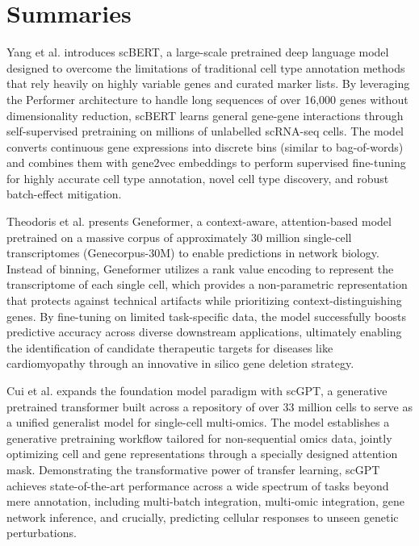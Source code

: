 \documentclass[12pt]{article}
\begin{document}
\section{Summaries}
Yang et al. \cite{yang2022scbert} introduces scBERT, a large-scale pretrained deep language model designed to overcome the limitations of traditional cell type annotation methods that rely heavily on highly variable genes and curated marker lists. By leveraging the Performer architecture to handle long sequences of over 16,000 genes without dimensionality reduction, scBERT learns general gene-gene interactions through self-supervised pretraining on millions of unlabelled scRNA-seq cells. The model converts continuous gene expressions into discrete bins (similar to bag-of-words) and combines them with gene2vec embeddings to perform supervised fine-tuning for highly accurate cell type annotation, novel cell type discovery, and robust batch-effect mitigation.

Theodoris et al. \cite{theodoris2023transfer} presents Geneformer, a context-aware, attention-based model pretrained on a massive corpus of approximately 30 million single-cell transcriptomes (Genecorpus-30M) to enable predictions in network biology. Instead of binning, Geneformer utilizes a rank value encoding to represent the transcriptome of each single cell, which provides a non-parametric representation that protects against technical artifacts while prioritizing context-distinguishing genes. By fine-tuning on limited task-specific data, the model successfully boosts predictive accuracy across diverse downstream applications, ultimately enabling the identification of candidate therapeutic targets for diseases like cardiomyopathy through an innovative in silico gene deletion strategy.

Cui et al. \cite{cui2024scgpt} expands the foundation model paradigm with scGPT, a generative pretrained transformer built across a repository of over 33 million cells to serve as a unified generalist model for single-cell multi-omics. The model establishes a generative pretraining workflow tailored for non-sequential omics data, jointly optimizing cell and gene representations through a specially designed attention mask. Demonstrating the transformative power of transfer learning, scGPT achieves state-of-the-art performance across a wide spectrum of tasks beyond mere annotation, including multi-batch integration, multi-omic integration, gene network inference, and crucially, predicting cellular responses to unseen genetic perturbations.
\end{document}
